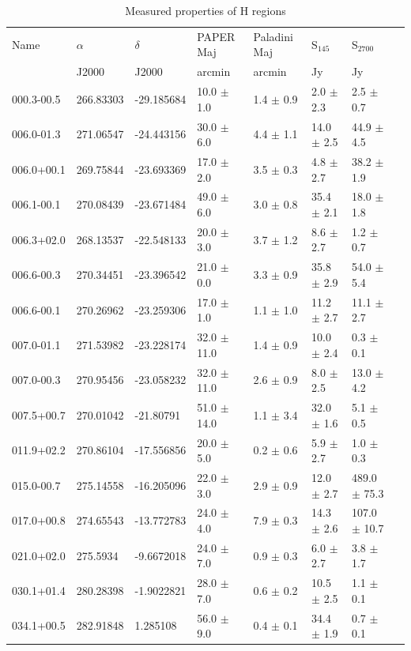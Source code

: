 \documentclass[useAMS,usenatbib]{mn2e}
\begin{document}
\begin{table}
\caption{Measured properties of {H} regions}
\begin{tabular}{llllllll}
\hline
Name &  $\alpha$   &  $\delta$  &  PAPER Maj   &  Paladini Maj &  S$_{145}$  &  S$_{2700}$\\
 & J2000  &  J2000  &  arcmin  &  arcmin  &  Jy  &  Jy\\
\hline
000.3-00.5 & 266.83303 & -29.185684 & 10.0 $\pm$ 1.0 & 1.4 $\pm$ 0.9 & 2.0 $\pm$ 2.3 & 2.5 $\pm$ 0.7 \\
006.0-01.3 & 271.06547 & -24.443156 & 30.0 $\pm$ 6.0 & 4.4 $\pm$ 1.1 & 14.0 $\pm$ 2.5 & 44.9 $\pm$ 4.5 \\
006.0+00.1 & 269.75844 & -23.693369 & 17.0 $\pm$ 2.0 & 3.5 $\pm$ 0.3 & 4.8 $\pm$ 2.7 & 38.2 $\pm$ 1.9 \\
006.1-00.1 & 270.08439 & -23.671484 & 49.0 $\pm$ 6.0 & 3.0 $\pm$ 0.8 & 35.4 $\pm$ 2.1 & 18.0 $\pm$ 1.8 \\
006.3+02.0 & 268.13537 & -22.548133 & 20.0 $\pm$ 3.0 & 3.7 $\pm$ 1.2 & 8.6 $\pm$ 2.7 & 1.2 $\pm$ 0.7 \\
006.6-00.3 & 270.34451 & -23.396542 & 21.0 $\pm$ 0.0 & 3.3 $\pm$ 0.9 & 35.8 $\pm$ 2.9 & 54.0 $\pm$ 5.4 \\
006.6-00.1 & 270.26962 & -23.259306 & 17.0 $\pm$ 1.0 & 1.1 $\pm$ 1.0 & 11.2 $\pm$ 2.7 & 11.1 $\pm$ 2.7 \\
007.0-01.1 & 271.53982 & -23.228174 & 32.0 $\pm$ 11.0 & 1.4 $\pm$ 0.9 & 10.0 $\pm$ 2.4 & 0.3 $\pm$ 0.1 \\
007.0-00.3 & 270.95456 & -23.058232 & 32.0 $\pm$ 11.0 & 2.6 $\pm$ 0.9 & 8.0 $\pm$ 2.5 & 13.0 $\pm$ 4.2 \\
007.5+00.7 & 270.01042 & -21.80791 & 51.0 $\pm$ 14.0 & 1.1 $\pm$ 3.4 & 32.0 $\pm$ 1.6 & 5.1 $\pm$ 0.5 \\
011.9+02.2 & 270.86104 & -17.556856 & 20.0 $\pm$ 5.0 & 0.2 $\pm$ 0.6 & 5.9 $\pm$ 2.7 & 1.0 $\pm$ 0.3 \\
015.0-00.7 & 275.14558 & -16.205096 & 22.0 $\pm$ 3.0 & 2.9 $\pm$ 0.9 & 12.0 $\pm$ 2.7 & 489.0 $\pm$ 75.3 \\
017.0+00.8 & 274.65543 & -13.772783 & 24.0 $\pm$ 4.0 & 7.9 $\pm$ 0.3 & 14.3 $\pm$ 2.6 & 107.0 $\pm$ 10.7 \\
021.0+02.0 & 275.5934 & -9.6672018 & 24.0 $\pm$ 7.0 & 0.9 $\pm$ 0.3 & 6.0 $\pm$ 2.7 & 3.8 $\pm$ 1.7 \\
030.1+01.4 & 280.28398 & -1.9022821 & 28.0 $\pm$ 7.0 & 0.6 $\pm$ 0.2 & 10.5 $\pm$ 2.5 & 1.1 $\pm$ 0.1 \\
034.1+00.5 & 282.91848 & 1.285108 & 56.0 $\pm$ 9.0 & 0.4 $\pm$ 0.1 & 34.4 $\pm$ 1.9 & 0.7 $\pm$ 0.1 \\

\end{tabular}
\end{table}
\end{document}
